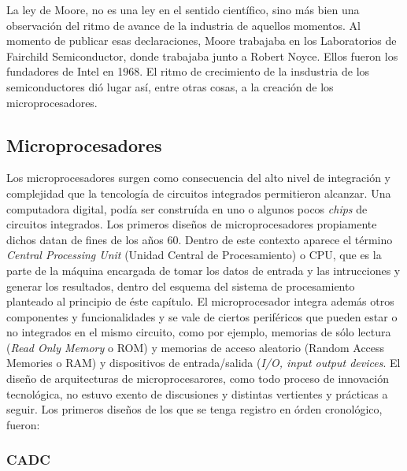 La ley de Moore, no es una ley en el sentido científico, sino más bien una
observación del ritmo de avance de la industria de aquellos momentos. Al momento
de publicar esas declaraciones, Moore trabajaba en los Laboratorios de Fairchild
Semiconductor, donde trabajaba junto a Robert Noyce. Ellos fueron los fundadores
de Intel en 1968. El ritmo de crecimiento de la insdustria de los
semiconductores dió lugar así, entre otras cosas, a la creación de los
microprocesadores.

\subsection{Microprocesadores}
\label{subsec:theory-history-microprocessor}

Los microprocesadores surgen como consecuencia del alto nivel de integración y
complejidad que la tencología de circuitos integrados permitieron alcanzar. Una
computadora digital, podía ser construída en uno o algunos pocos \emph{chips} de
circuitos integrados. Los primeros diseños de microprocesadores propiamente
dichos datan de fines de los años 60. Dentro de este contexto aparece el término
\emph{Central Processing Unit} (Unidad Central de Procesamiento) o CPU, que es
la parte de la máquina encargada de tomar los datos de entrada y las
intrucciones y generar los resultados, dentro del esquema del sistema de
procesamiento planteado al principio de éste capítulo. El microprocesador
integra además otros componentes y funcionalidades y se vale de ciertos
periféricos que pueden estar o no integrados en el mismo circuito, como por
ejemplo, memorias de sólo lectura (\emph{Read Only Memory} o ROM) y memorias de
acceso aleatorio (Random Access Memories o RAM) y dispositivos de
entrada/salida (\emph{I/O, input output devices}. El diseño de arquitecturas de
microprocesarores, como todo proceso de innovación tecnológica, no estuvo exento
de discusiones y distintas vertientes y prácticas a seguir. Los primeros diseños
de los que se tenga registro en órden cronológico, fueron:

\subsubsection{CADC}
\label{subsubsec:theory-history-microprocessor-cadc}

